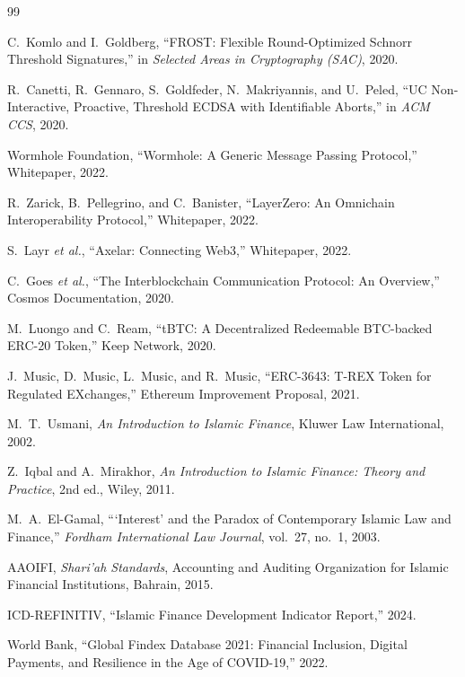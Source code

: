 \begin{thebibliography}{99}

 C.~Komlo and I.~Goldberg, ``FROST: Flexible Round-Optimized Schnorr Threshold Signatures,'' in \emph{Selected Areas in Cryptography (SAC)}, 2020.

 R.~Canetti, R.~Gennaro, S.~Goldfeder, N.~Makriyannis, and U.~Peled, ``UC Non-Interactive, Proactive, Threshold ECDSA with Identifiable Aborts,'' in \emph{ACM CCS}, 2020.

 Wormhole Foundation, ``Wormhole: A Generic Message Passing Protocol,'' Whitepaper, 2022.

 R.~Zarick, B.~Pellegrino, and C.~Banister, ``LayerZero: An Omnichain Interoperability Protocol,'' Whitepaper, 2022.

 S.~Layr \emph{et al.}, ``Axelar: Connecting Web3,'' Whitepaper, 2022.

 C.~Goes \emph{et al.}, ``The Interblockchain Communication Protocol: An Overview,'' Cosmos Documentation, 2020.

 M.~Luongo and C.~Ream, ``tBTC: A Decentralized Redeemable BTC-backed ERC-20 Token,'' Keep Network, 2020.

 J.~Music, D.~Music, L.~Music, and R.~Music, ``ERC-3643: T-REX Token for Regulated EXchanges,'' Ethereum Improvement Proposal, 2021.

 M.~T.~Usmani, \emph{An Introduction to Islamic Finance}, Kluwer Law International, 2002.

 Z.~Iqbal and A.~Mirakhor, \emph{An Introduction to Islamic Finance: Theory and Practice}, 2nd ed., Wiley, 2011.

 M.~A.~El-Gamal, ```Interest' and the Paradox of Contemporary Islamic Law and Finance,'' \emph{Fordham International Law Journal}, vol.~27, no.~1, 2003.

 AAOIFI, \emph{Shari'ah Standards}, Accounting and Auditing Organization for Islamic Financial Institutions, Bahrain, 2015.

 ICD-REFINITIV, ``Islamic Finance Development Indicator Report,'' 2024.

 World Bank, ``Global Findex Database 2021: Financial Inclusion, Digital Payments, and Resilience in the Age of COVID-19,'' 2022.


\end{thebibliography}
